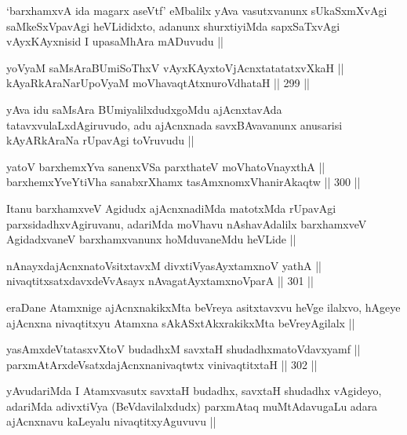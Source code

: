 \begin{artha}
`barxhamxvA ida magarx aseVtf' eMbalilx yAva vasutxvanunx sUkaSxmXvAgi
  saMkeSxVpavAgi heVLididxto, adanunx shurxtiyiMda sapxSaTxvAgi
  vAyxKAyxnisid I upasaMhAra mADuvudu ||
\end{artha}


\begin{shl}
yoV\s yaM saMsAraBUmiSoThxV vAyxKAyxtoV\s jAcnxtatatatxvXkaH || \\
kAyaRkAraNarUpoV\s yaM moVhavaqtAtxnuroVdhataH ||  299 ||  
\end{shl}

\begin{artha}
yAva idu saMsAra BUmiyalilxdudxgoMdu ajAcnxtavAda
tatavxvulaLxdAgiruvudo, adu ajAcnxnada savxBAvavanunx anusarisi
kAyARkAraNa rUpavAgi toVruvudu ||
\end{artha}

\begin{shl}
yatoV barxhemxYva sanenxVSa parxthateV moVhatoV\s nayxthA || \\
barxhemxYveYtiVha sanabxrXhamx tasAmxnomxVhanirAkaqtw ||  300 ||  
\end{shl}

\begin{artha}
Itanu barxhamxveV Agidudx ajAcnxnadiMda matotxMda rUpavAgi
parxsidadhxvAgiruvanu, adariMda moVhavu nAshavAdalilx barxhamxveV
AgidadxvaneV barxhamxvanunx hoMduvaneMdu heVLide ||
\end{artha}

\begin{shl}
nAnayxdajAcnxnatoV\s sitxtavxM divxtiVyasAyx\s \s tamxnoV yathA || \\
nivaqtitxsatxdavxdeVvAsayx nAvagatAyxtamxnoV\s parA ||  301 ||  
\end{shl}

\begin{artha}
eraDane Atamxnige ajAcnxnakikxMta beVreya asitxtavxvu heVge ilalxvo,
hAgeye ajAcnxna nivaqtitxyu Atamxna sAkASxtAkxrakikxMta beVreyAgilalx ||
\end{artha}

\begin{shl}
yasAmxdeVtatasxvXtoV budadhxM savxtaH shudadhxmatoV\s davxyamf || \\
parxmAtArxdeVsatxdajAcnxnanivaqtwtx vinivaqtitxtaH ||  302 || 
\end{shl}

\begin{artha}
yAvudariMda I Atamxvasutx savxtaH budadhx, savxtaH shudadhx vAgideyo,
adariMda adivxtiVya (BeVdavilalxdudx) parxmAtaq muMtAdavugaLu adara
ajAcnxnavu kaLeyalu nivaqtitxyAguvuvu ||
\end{artha}

